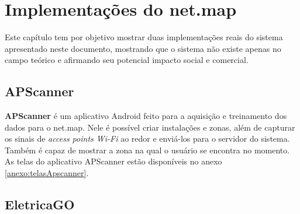 \chapter{Implementações do net.map}\label{chp:implementations}

Este capítulo tem por objetivo mostrar duas implementações reais do sistema apresentado neste documento, mostrando que o sistema não existe apenas no campo teórico e afirmando seu potencial impacto social e comercial.

\section{APScanner}

\textbf{APScanner} é um aplicativo Android feito para a aquisição e treinamento dos dados para o net.map. Nele é possível criar instalações e zonas, além de capturar os sinais de \textit{access points Wi-Fi} ao redor e enviá-los para o servidor do sistema. Também é capaz de mostrar a zona na qual o usuário se encontra no momento.
\\
As telas do aplicativo APScanner estão disponíveis no anexo \ref{anexo:telasApscanner}.

\section{EletricaGO}